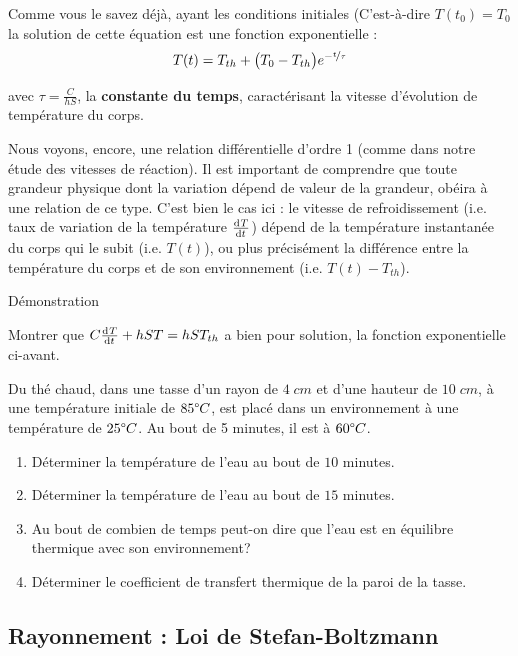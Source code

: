 \documentclass[11pt,a4paper]{article}
\begin{document}
Comme vous le savez déjà, ayant les conditions initiales (C'est-à-dire $T(t_0) = T_0$ la solution de cette équation est une fonction exponentielle : 
\[ T(t) = T_{th} +\big( T_0 - T_{th} \big)e^{-\nicefrac{t}{\tau}}   \]

avec $\tau = \frac{C}{hS}$, la \textbf{constante du temps}, caractérisant la vitesse d'évolution de température du corps. 

\begin{rmrq}
Nous voyons, encore, une relation différentielle d'ordre 1 (comme dans notre étude des vitesses de réaction). Il est important de comprendre que toute grandeur physique dont la variation dépend de valeur de la grandeur, obéira à une relation de ce type. C'est bien le cas ici : le vitesse de refroidissement (i.e. taux de variation de la température $\od{T}{t}$) dépend de la température instantanée du corps qui le subit (i.e. $T(t)$), ou plus précisément la différence entre la température du corps et de son environnement (i.e. $T(t) - T_{th}$). 
\end{rmrq}


\begin{exo}{Démonstration}

Montrer que  $C\od{T}{t} + hST =  hS T_{th}$ a bien pour solution, la fonction exponentielle ci-avant. 
\vspace{4cm}
\end{exo}

\begin{exo}
Du thé chaud, dans une tasse d'un rayon de $4\; cm$ et d'une hauteur de $10\; cm$, à une température initiale de $85\degree C$, est placé dans un environnement à une température de $25\degree C$. Au bout de 5 minutes, il est à $60\degree C$. 
\begin{enumerate}
    \item Déterminer la température de l'eau au bout de $10$ minutes. 
    \item Déterminer la température de l'eau au bout de $15$ minutes. 
    \item Au bout de combien de temps peut-on dire que l'eau est en équilibre thermique avec son environnement? 
    \item Déterminer le coefficient de transfert thermique de la paroi de la tasse. 
\end{enumerate}
\vspace{10cm}
\end{exo}

\subsection{Rayonnement : Loi de Stefan-Boltzmann}
\end{document}

